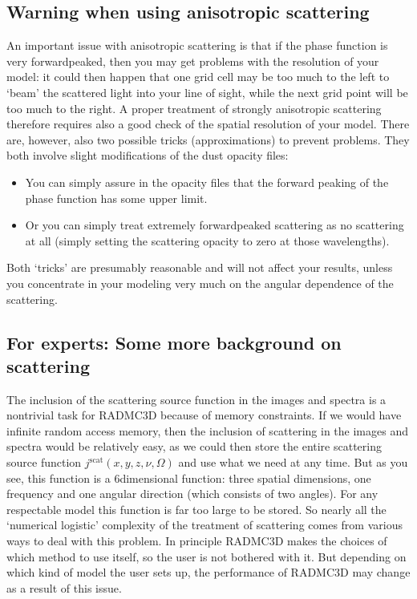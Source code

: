 \documentclass[letterpaper,10pt,english]{sphinxmanual}
\begin{document}
\subsection{Warning when using an\sphinxhyphen{}isotropic scattering}
\label{\detokenize{dustradtrans:warning-when-using-an-isotropic-scattering}}
An important issue with anisotropic scattering is that if the phase function is
very forward\sphinxhyphen{}peaked, then you may get problems with the  resolution
of your model: it could then happen that one grid cell may be too much to the
left to ‘beam’ the scattered light into your line of sight, while the next grid
point will be too much to the right. A proper treatment of strongly anisotropic
scattering therefore requires also a good check of the spatial resolution of
your model. There are, however, also two possible tricks (approximations) to
prevent problems. They both involve slight modifications of the dust opacity
files:
\begin{itemize}
\item {} 
You can simply assure in the opacity files that the forward peaking of
the phase function has some upper limit.

\item {} 
Or you can simply treat extremely forward\sphinxhyphen{}peaked scattering as no
scattering at all (simply setting the scattering opacity to zero at those
wavelengths).

\end{itemize}

Both ‘tricks’ are presumably reasonable and will not affect your results, unless
you concentrate in your modeling very much on the angular dependence of the
scattering.


\subsection{For experts: Some more background on scattering}
\label{\detokenize{dustradtrans:for-experts-some-more-background-on-scattering}}\label{\detokenize{dustradtrans:sec-scat-background}}
The inclusion of the scattering source function in the images and spectra is a
non\sphinxhyphen{}trivial task for RADMC\sphinxhyphen{}3D because of memory constraints. If we would have
infinite random access memory, then the inclusion of scattering in the images
and spectra would be relatively easy, as we could then store the entire
scattering source function \(j^{\mathrm{scat}}(x,y,z,\nu,\Omega)\) and use
what we need at any time. But as you see, this function is a 6\sphinxhyphen{}dimensional
function: three spatial dimensions, one frequency and one angular direction
(which consists of two angles). For any respectable model this function is far
too large to be stored. So nearly all the ‘numerical logistic’ complexity of the
treatment of scattering comes from various ways to deal with this problem. In
principle RADMC\sphinxhyphen{}3D makes the choices of which method to use itself, so the user
is not bothered with it. But depending on which kind of model the user sets up,
the performance of RADMC\sphinxhyphen{}3D may change as a result of this issue.
\end{document}
